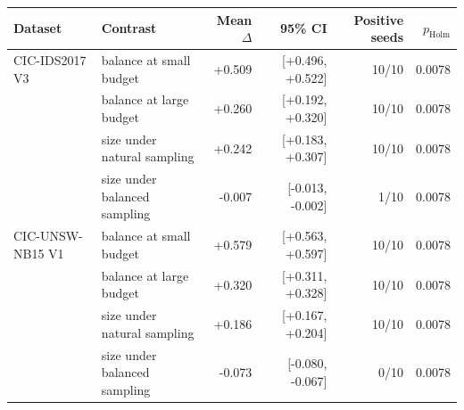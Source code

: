 \begin{tabular}{@{}llrrrr@{}}
\toprule
Dataset & Contrast & Mean $\Delta$ & 95\% CI & Positive seeds & $p_{\mathrm{Holm}}$ \\
\midrule
CIC-IDS2017 V3 & balance at small budget & +0.509 & [+0.496, +0.522] & 10/10 & 0.0078 \\
 & balance at large budget & +0.260 & [+0.192, +0.320] & 10/10 & 0.0078 \\
 & size under natural sampling & +0.242 & [+0.183, +0.307] & 10/10 & 0.0078 \\
 & size under balanced sampling & -0.007 & [-0.013, -0.002] & 1/10 & 0.0078 \\
\addlinespace
CIC-UNSW-NB15 V1 & balance at small budget & +0.579 & [+0.563, +0.597] & 10/10 & 0.0078 \\
 & balance at large budget & +0.320 & [+0.311, +0.328] & 10/10 & 0.0078 \\
 & size under natural sampling & +0.186 & [+0.167, +0.204] & 10/10 & 0.0078 \\
 & size under balanced sampling & -0.073 & [-0.080, -0.067] & 0/10 & 0.0078 \\
\bottomrule
\end{tabular}
